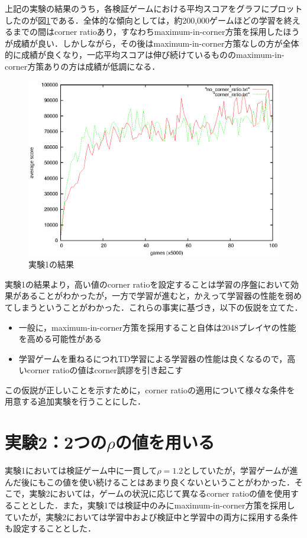 \documentclass{suribt}
\begin{document}
上記の実験の結果のうち，各検証ゲームにおける平均スコアをグラフにプロットしたのが図\ref{figure_006}である．全体的な傾向としては，約200,000ゲームほどの学習を終えるまでの間はcorner ratioあり，すなわちmaximum-in-corner方策を採用したほうが成績が良い．しかしながら，その後はmaximum-in-corner方策なしの方が全体的に成績が良くなり，一応平均スコアは伸び続けているもののmaximum-in-corner方策ありの方は成績が低調になる．

\begin{figure}[t]
	\begin{center}
	\includegraphics[width=13cm]{figure_006.eps}
	\caption{実験1の結果}
	\label{figure_006}
	\end{center}
\end{figure}

実験1の結果より，高い値のcorner ratioを設定することは学習の序盤において効果があることがわかったが，一方で学習が進むと，かえって学習器の性能を弱めてしまうということがわかった．これらの事実に基づき，以下の仮説を立てた．

\begin{itemize}
\item 一般に，maximum-in-corner方策を採用すること自体は2048プレイヤの性能を高める可能性がある
\item 学習ゲームを重ねるにつれTD学習による学習器の性能は良くなるので，高いcorner ratioの値はcorner誤謬を引き起こす
\end{itemize}

この仮説が正しいことを示すために，corner ratioの適用について様々な条件を用意する追加実験を行うことにした．

\section{実験2：2つの${\rho}$の値を用いる}
実験1においては検証ゲーム中に一貫して${\rho}=1.2$としていたが，学習ゲームが進んだ後にもこの値を使い続けることはあまり良くないということがわかった．そこで，実験2においては，ゲームの状況に応じて異なるcorner ratioの値を使用することとした．また，実験1では検証中のみにmaximum-in-corner方策を採用していたが，実験2においては学習中および検証中と学習中の両方に採用する条件も設定することとした．
\end{document}
